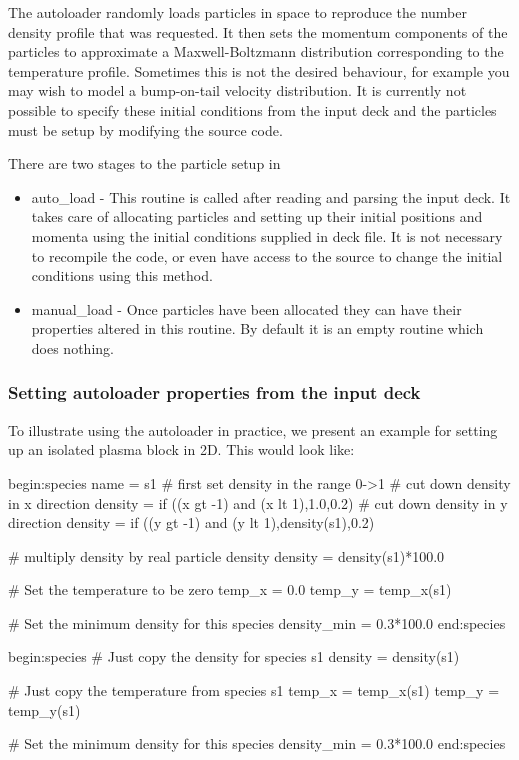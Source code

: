 The autoloader randomly loads particles in space to reproduce the number
density profile that was requested. It then sets the momentum components
of the particles to approximate a Maxwell-Boltzmann distribution
corresponding to the temperature profile. Sometimes this is not the
desired behaviour, for example you may wish to model a bump-on-tail
velocity distribution. It is currently not possible to specify these
initial conditions from the input deck and the particles must be setup
by modifying the source code.

There are two stages to the particle setup in {\EPOCH}

\begin{itemize}
\item auto\_load - This routine is called after reading and parsing the
  input deck. It takes care of allocating particles and setting up their
  initial positions and momenta using the initial conditions supplied in
  deck file.
  It is not necessary to recompile the code, or even have
  access to the source to change the initial conditions using this method.
\item manual\_load - Once particles have been allocated they can have their
  properties altered in this routine. By default it is an empty routine
  which does nothing.
\end{itemize}

\subsubsection{Setting autoloader properties from the input deck}
To illustrate using the autoloader in practice, we present an example for
setting up an isolated plasma block in 2D. This would look like:
\begin{boxverbatim}
begin:species
   name = s1
   # first set density in the range 0->1
   # cut down density in x direction
   density = if ((x gt -1) and (x lt 1),1.0,0.2)
   # cut down density in y direction
   density = if ((y gt -1) and (y lt 1),density(s1),0.2)

   # multiply density by real particle density
   density = density(s1)*100.0

   # Set the temperature to be zero
   temp_x = 0.0
   temp_y = temp_x(s1)

   # Set the minimum density for this species
   density_min = 0.3*100.0
end:species

begin:species
   # Just copy the density for species s1
   density = density(s1)

   # Just copy the temperature from species s1
   temp_x = temp_x(s1)
   temp_y = temp_y(s1)

   # Set the minimum density for this species
   density_min = 0.3*100.0
end:species
\end{boxverbatim}


